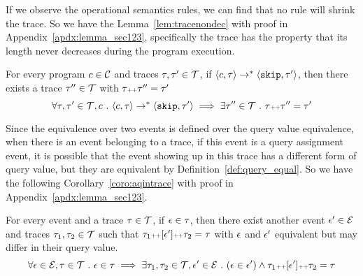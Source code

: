   
  If we observe the operational semantics rules, we can find that no rule will shrink the trace. 
So we have the Lemma~\ref{lem:tracenondec} with proof in Appendix~\ref{apdx:lemma_sec123}, 
specifically the trace has the property that its length never decreases during the program execution.
\begin{lem}
\label{lem:tracenondec}
For every program $c \in \mathcal{C}$ and traces $\mathtt{\tau}, \mathtt{\tau}' \in \mathcal{T}$, if 
$\langle c, \mathtt{\tau} \rangle \rightarrow^{*} \langle \mathtt{skip}, \mathtt{\tau}' \rangle$,
then there exists a trace $\mathtt{\tau}'' \in \mathcal{T}$ with $\mathtt{\tau} {\scriptscriptstyle ++} \mathtt{\tau}'' = \mathtt{\tau}'$
%
$$
\forall \mathtt{\tau}, \mathtt{\tau}' \in \mathcal{T}, c ~.~ 
\langle c, \mathtt{\tau} \rangle \rightarrow^{*} \langle \mathtt{skip}, \mathtt{\tau}' \rangle 
\implies \exists \mathtt{\tau}'' \in \mathcal{T} ~.~ \mathtt{\tau} {\scriptscriptstyle ++} \mathtt{\tau}'' = \mathtt{\tau}'
$$
\end{lem}
Since the equivalence over two events is defined over the query value equivalence, 
when there is an event belonging to a trace, 
if this event is a query assignment event, 
it is possible that 
the event showing up in this trace has a different form of query value, 
but they are equivalent by Definition~\ref{def:query_equal}.
So we have the following Corollary~\ref{coro:aqintrace} with proof in Appendix~\ref{apdx:lemma_sec123}.
\begin{coro}
\label{coro:aqintrace}
For every event and a trace $\mathtt{\tau} \in \mathcal{T}$,
if $\mathtt{\epsilon} \in \mathtt{\tau}$, 
then there exist another event $\mathtt{\epsilon}' \in \mathcal{E}$ and traces $\mathtt{\tau}_1, \mathtt{\tau}_2 \in \mathcal{T}$
such that $\mathtt{\tau}_1 {\scriptscriptstyle ++} [\mathtt{\epsilon}'] {\scriptscriptstyle ++} \mathtt{\tau}_2 = \mathtt{\tau} $
with 
$\mathtt{\epsilon}$ and $\mathtt{\epsilon}'$ equivalent but may differ in their query value.
\[
  \forall \mathtt{\epsilon} \in \mathcal{E}, \mathtt{\tau} \in \mathcal{T} ~.~ 
\mathtt{\epsilon} \in \mathtt{\tau} \implies \exists \mathtt{\tau}_1, \mathtt{\tau}_2 \in \mathcal{T}, 
\mathtt{\epsilon}' \in \mathcal{E} ~.~ (\mathtt{\epsilon} \in \mathtt{\epsilon}') \land \mathtt{\tau}_1 {\scriptscriptstyle ++} [\mathtt{\epsilon}'] {\scriptscriptstyle ++} \mathtt{\tau}_2 = \mathtt{\tau}  
\]
\end{coro}